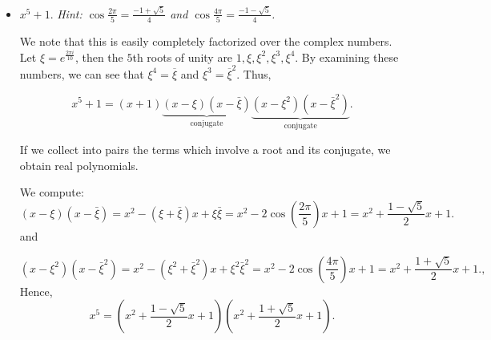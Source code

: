 \documentclass[11pt,dvipsnames]{book}
\numberwithin{figure}{section} %
\numberwithin{table}{section} %
\begin{document}
\begin{exercise}
\begin{itemize}
\item $x^5+1$. {\it Hint: $\cos \frac{2\pi}{5}= \frac{-1+\sqrt{5}}{4}$ and $\cos \frac{4\pi}{5}= \frac{-1-\sqrt{5}}{4}$.}

\begin{solution}
We note that this is easily completely factorized over the complex numbers.  Let $\xi = e^{\frac{2\pi i}{10}}$, then the $5$th roots of unity are $1,\xi,\xi^2, \xi^3,\xi^4$. By examining these numbers, we can see that $\xi^{4}=\overline{\xi}$ and $\xi^{3} = \overline{\xi}^{2}$.  Thus,

$$x^5+1 = (x+1)\underbrace{(x-\xi)(x-\bar{\xi})}_{\textrm{conjugate}}\underbrace{(x-\xi^2)(x-\bar{\xi}^2)}_{\textrm{conjugate}}.$$

If we collect into pairs the terms which involve a root and its conjugate, we obtain real polynomials.

We compute:
$$(x-\xi)(x-\bar{\xi}) = x^2 - (\xi+\bar{\xi})x + \xi\bar{\xi} = x^2 - 2\cos(\frac{2\pi}{5})x+1
= x^2 +\frac{1-\sqrt{5}}{2}x+1.
$$
and

$$(x-\xi^2)(x-\bar{\xi}^2) = x^2 -(\xi^2 + \bar{\xi}^2)x + \xi^2\bar{\xi}^2 = x^2 - 2\cos(\frac{4\pi}{5})x+1
= x^2 +\frac{1+\sqrt{5}}{2}x+1.
,$$
Hence,
\[
x^5 = \left(x^2 +\frac{1-\sqrt{5}}{2}x+1\right) \left(x^2 +\frac{1+\sqrt{5}}{2}x+1\right).
\]
\end{solution}


\end{itemize}
\end{exercise}
\end{document}
